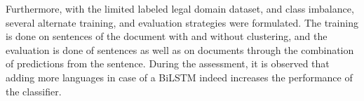 Furthermore, with the limited labeled legal domain dataset, and class imbalance, several alternate training, and evaluation strategies were formulated. The training is done on sentences of the document with and without clustering, and the evaluation is done of sentences as well as on documents through the combination of predictions from the sentence. During the assessment, it is observed that adding more languages in case of a \gls{BiLSTM} indeed increases the performance of the classifier.































